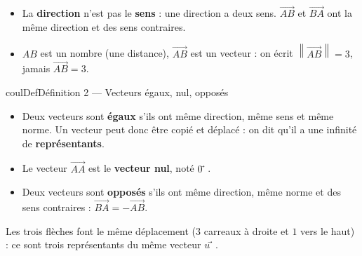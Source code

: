 \documentclass[11pt,a4paper]{article}
\makeatletter
\newcommand{\vect}[1]{\overrightarrow{#1}}
\newcommand{\norme}[1]{\left\lVert #1 \right\rVert}
\newcommand{\quadrillage}[4]{\draw[grille,step=1] (#1,#2) grid (#3,#4);}
\newcounter{lycee@signet}
\newcommand{\signet}[3][]{\stepcounter{lycee@signet}%
  \edef\lycee@dest{\if\relax\detokenize{#1}\relax
    signet.\arabic{lycee@signet}\else#1\fi}%
  \hypertarget{\lycee@dest}{}\bookmark[level=#2,dest=\lycee@dest]{#3}}
\def\vec#1{#1⃗}}%
\newenvironment{definitionbox}[1][Définition]%
  {\begin{boitecours}[phantom={\signet{2}{#1}}]{coulDef}{#1}}{\end{boitecours}}
\makeatother
\begin{document}
\begin{remarquebox}
\begin{itemize}
  \item La \textbf{direction} n'est pas le \textbf{sens} : une direction a deux sens.
        $\vect{AB}$ et $\vect{BA}$ ont la même direction et des sens contraires.
  \item $AB$ est un nombre (une distance), $\vect{AB}$ est un vecteur : on écrit
        $\norme{\vect{AB}}=3$, jamais $\vect{AB}=3$.
\end{itemize}
\end{remarquebox}

\begin{definitionbox}[Définition 2 --- Vecteurs égaux, nul, opposés]
\begin{itemize}
  \item Deux vecteurs sont \textbf{égaux} s'ils ont même direction, même sens et même
        norme. Un vecteur peut donc être copié et déplacé : on dit qu'il a une infinité
        de \textbf{représentants}.
  \item Le vecteur $\vect{AA}$ est le \textbf{vecteur nul}, noté $\vec{0}$.
  \item Deux vecteurs sont \textbf{opposés} s'ils ont même direction, même norme et
        des sens contraires : $\vect{BA}=-\vect{AB}$.
\end{itemize}
\end{definitionbox}

\begin{exemplebox}
\begin{center}
\end{center}
Les trois flèches font le même déplacement ($3$ carreaux à droite et $1$ vers le haut) :
ce sont trois représentants du même vecteur $\vec{u}$.
\end{exemplebox}
\end{document}
